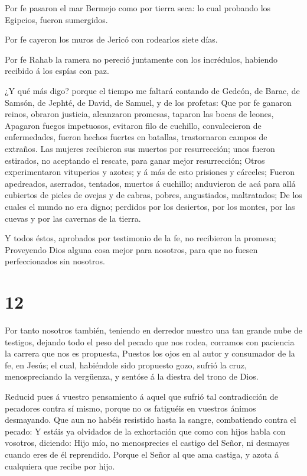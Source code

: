  Por fe pasaron el mar Bermejo como por tierra seca: lo
cual probando los Egipcios, fueron sumergidos.

 Por fe cayeron los muros de Jericó con rodearlos siete
días.

 Por fe Rahab la ramera no pereció juntamente con los
incrédulos, habiendo recibido á los espías con paz.

 ¿Y qué más digo? porque el tiempo me faltará contando de
Gedeón, de Barac, de Samsón, de Jephté, de David, de Samuel, y de los
profetas:  Que por fe ganaron reinos, obraron justicia,
alcanzaron promesas, taparon las bocas de leones,  Apagaron
fuegos impetuosos, evitaron filo de cuchillo, convalecieron de
enfermedades, fueron hechos fuertes en batallas, trastornaron campos de
extraños.  Las mujeres recibieron sus muertos por
resurrección; unos fueron estirados, no aceptando el rescate, para ganar
mejor resurrección;  Otros experimentaron vituperios y
azotes; y á más de esto prisiones y cárceles;  Fueron
apedreados, aserrados, tentados, muertos á cuchillo; anduvieron de acá
para allá cubiertos de pieles de ovejas y de cabras, pobres,
angustiados, maltratados;  De los cuales el mundo no era
digno; perdidos por los desiertos, por los montes, por las cuevas y por
las cavernas de la tierra.

 Y todos éstos, aprobados por testimonio de la fe, no
recibieron la promesa;  Proveyendo Dios alguna cosa mejor
para nosotros, para que no fuesen perfeccionados sin nosotros.

\hypertarget{section-11}{%
\section{12}\label{section-11}}

 Por tanto nosotros también, teniendo en derredor nuestro
una tan grande nube de testigos, dejando todo el peso del pecado que nos
rodea, corramos con paciencia la carrera que nos es propuesta,
 Puestos los ojos en al autor y consumador de la fe, en
Jesús; el cual, habiéndole sido propuesto gozo, sufrió la cruz,
menospreciando la vergüenza, y sentóse á la diestra del trono de Dios.

 Reducid pues á vuestro pensamiento á aquel que sufrió tal
contradicción de pecadores contra sí mismo, porque no os fatiguéis en
vuestros ánimos desmayando.  Que aun no habéis resistido
hasta la sangre, combatiendo contra el pecado:  Y estáis ya
olvidados de la exhortación que como con hijos habla con vosotros,
diciendo: Hijo mío, no menosprecies el castigo del Señor, ni desmayes
cuando eres de él reprendido.  Porque el Señor al que ama
castiga, y azota á cualquiera que recibe por hijo.

